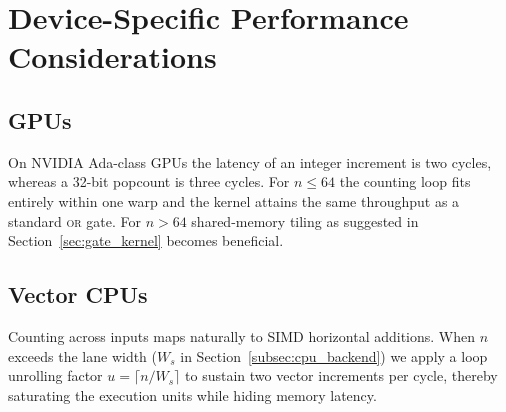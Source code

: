 \section{Device-Specific Performance Considerations}
\label{sec:voter_perf}

\subsection{GPUs}
On NVIDIA Ada-class GPUs the latency of an integer increment is two cycles,
whereas a 32-bit popcount is three cycles.  For $n\le 64$ the counting loop
fits entirely within one warp and the kernel attains the same throughput as a
standard \textsc{or} gate.  For $n>64$ shared-memory tiling as suggested in
Section~\ref{sec:gate_kernel} becomes beneficial.

\subsection{Vector CPUs}
Counting across inputs maps naturally to SIMD horizontal additions.  When $n$
exceeds the lane width ($W_s$ in Section~\ref{subsec:cpu_backend}) we apply a
loop unrolling factor $u=\lceil n/W_s\rceil$ to sustain two vector increments
per cycle, thereby saturating the execution units while hiding memory
latency.

